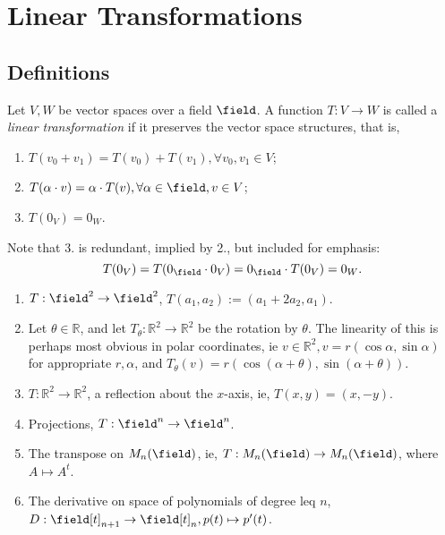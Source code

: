 \section{Linear Transformations}
\subsection{Definitions}
\begin{definition}
    Let $V, W$ be vector spaces over a field $\field$. A function $T: V \to W$ is called a \emph{linear transformation} if it preserves the vector space structures, that is, \begin{enumerate}
        \item $T(v_0 + v_1) = T(v_0) + T(v_1), \forall v_0, v_1 \in V$;
        \item $T(\alpha \cdot v) = \alpha \cdot T(v), \forall \alpha \in \field, v \in V$;
        \item $T(0_V) = 0_W$.
    \end{enumerate}
\end{definition}

\begin{remark}
    Note that 3. is redundant, implied by 2., but included for emphasis:
    \[
    T(0_V) = T(0_\field \cdot 0_V) = 0_\field \cdot T(0_V) = 0_W.    
    \]
\end{remark}

\begin{example}
    \begin{enumerate}
        \item $T: \field^2 \to \field^2$, $T(a_1, a_2) := (a_1 + 2 a_2, a_1)$.
        \item Let $\theta \in \mathbb{R}$, and let $T_\theta : \mathbb{R}^2 \to \mathbb{R}^2$ be the rotation by $\theta$. The linearity of this is perhaps most obvious in polar coordinates, ie $v \in \mathbb{R}^2, v = r (\cos \alpha, \sin \alpha)$ for appropriate $r, \alpha$, and $T_\theta(v) = r (\cos (\alpha + \theta), \sin (\alpha + \theta))$.
        \item $T: \mathbb{R}^2 \to \mathbb{R}^2$, a reflection about the $x$-axis, ie, $T(x, y) = (x, -y)$.
        \item Projections, $T : \field^n \to \field^n$.
        \item The transpose on $M_n(\field)$, ie, $T: M_n(\field) \to M_n (\field)$, where $A \mapsto A^t$.
        \item The derivative on space of polynomials of degree leq $n$, $D : \field[t]_{n+1} \to \field[t]_{n}, p(t) \mapsto p'(t)$.
    \end{enumerate}
\end{example}

